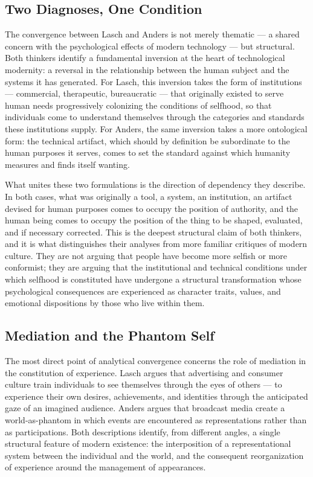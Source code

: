 \documentclass[12pt]{memoir}
\begin{document}
\subsection{Two Diagnoses, One Condition}

The convergence between Lasch and Anders is not merely thematic — a shared concern with the
psychological effects of modern technology — but structural. Both thinkers identify a
fundamental inversion at the heart of technological modernity: a reversal in the relationship
between the human subject and the systems it has generated. For Lasch, this inversion takes the
form of institutions — commercial, therapeutic, bureaucratic — that originally existed to serve
human needs progressively colonizing the conditions of selfhood, so that individuals come to
understand themselves through the categories and standards these institutions supply. For Anders,
the same inversion takes a more ontological form: the technical artifact, which should by
definition be subordinate to the human purposes it serves, comes to set the standard against
which humanity measures and finds itself wanting.

What unites these two formulations is the direction of dependency they describe. In both cases,
what was originally a tool, a system, an institution, an artifact devised for human purposes
comes to occupy the position of authority, and the human being comes to occupy the position of
the thing to be shaped, evaluated, and if necessary corrected. This is the deepest structural
claim of both thinkers, and it is what distinguishes their analyses from more familiar critiques
of modern culture. They are not arguing that people have become more selfish or more
conformist; they are arguing that the institutional and technical conditions under which
selfhood is constituted have undergone a structural transformation whose psychological
consequences are experienced as character traits, values, and emotional dispositions by those
who live within them.

\subsection{Mediation and the Phantom Self}

The most direct point of analytical convergence concerns the role of mediation in the
constitution of experience. Lasch argues that advertising and consumer culture train individuals
to see themselves through the eyes of others — to experience their own desires, achievements,
and identities through the anticipated gaze of an imagined audience. Anders argues that
broadcast media create a world-as-phantom in which events are encountered as representations
rather than as participations. Both descriptions identify, from different angles, a single
structural feature of modern existence: the interposition of a representational system between
the individual and the world, and the consequent reorganization of experience around the
management of appearances.
\end{document}
